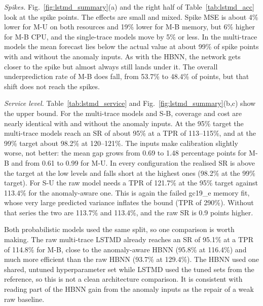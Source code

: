 \documentclass[conference]{IEEEtran}
\begin{document}
\textit{Spikes.}
Fig.~\ref{fig:lstmd_summary}(a) and the right half of Table~\ref{tab:lstmd_acc} look at the spike points. The effects are small and mixed. Spike MSE is about 4\% lower for M-U on both resources and 19\% lower for M-B memory, but 6\% higher for M-B CPU, and the single-trace models move by 5\% or less. In the multi-trace models the mean forecast lies below the actual value at about 99\% of spike points with and without the anomaly inputs. As with the HBNN, the network gets closer to the spike but almost always still lands under it. The overall underprediction rate of M-B does fall, from 53.7\% to 48.4\% of points, but that shift does not reach the spikes.

\textit{Service level.}
Table~\ref{tab:lstmd_service} and Fig.~\ref{fig:lstmd_summary}(b,c) show the upper bound. For the multi-trace models and S-B, coverage and cost are nearly identical with and without the anomaly inputs. At the 95\% target the multi-trace models reach an SR of about 95\% at a TPR of 113--115\%, and at the 99\% target about 98.2\% at 120--121\%. The inputs make calibration slightly worse, not better: the mean gap grows from 0.69 to 1.48 percentage points for M-B and from 0.61 to 0.99 for M-U. In every configuration the realised SR is above the target at the low levels and falls short at the highest ones (98.2\% at the 99\% target). For S-U the raw model needs a TPR of 121.7\% at the 95\% target against 113.4\% for the anomaly-aware one. This is again the failed gc19\_e memory fit, whose very large predicted variance inflates the bound (TPR of 290\%). Without that series the two are 113.7\% and 113.4\%, and the raw SR is 0.9 points higher.

Both probabilistic models used the same split, so one comparison is worth making. The raw multi-trace LSTMD already reaches an SR of 95.1\% at a TPR of 114.8\% for M-B, close to the anomaly-aware HBNN (95.8\% at 116.4\%) and much more efficient than the raw HBNN (93.7\% at 129.4\%). The HBNN used one shared, untuned hyperparameter set while LSTMD used the tuned sets from the reference, so this is not a clean architecture comparison. It is consistent with reading part of the HBNN gain from the anomaly inputs as the repair of a weak raw baseline.
\end{document}
